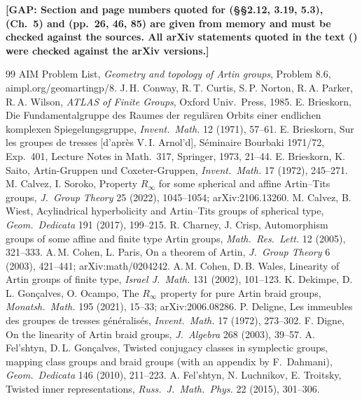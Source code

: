 \documentclass[11pt]{amsart}
\theoremstyle{definition}
\newcommand{\GAP}[1]{\textbf{[GAP: #1]}}
\begin{document}
\noindent\GAP{Section and page numbers quoted for \cite{Hum90} (\S\S2.12, 3.19, 5.3), \cite{OT92} (Ch.~5) and \cite{ATLAS} (pp.~26, 46, 85) are given from memory and must be checked against the sources. All arXiv statements quoted in the text (\cite{CP03,FP06,SV24,Sor26,PS26,JMS25,Tro22,DGO21}) were checked against the arXiv versions.}

\begin{thebibliography}{99}
 AIM Problem List, \emph{Geometry and topology of Artin groups}, Problem 8.6, aimpl.org/geomartingp/8.
 J.\,H. Conway, R.\,T. Curtis, S.\,P. Norton, R.\,A. Parker, R.\,A. Wilson, \emph{ATLAS of Finite Groups}, Oxford Univ.\ Press, 1985.
 E. Brieskorn, Die Fundamentalgruppe des Raumes der regul\"aren Orbits einer endlichen komplexen Spiegelungsgruppe, \emph{Invent.\ Math.} 12 (1971), 57--61.
 E. Brieskorn, Sur les groupes de tresses [d'apr\`es V.\,I. Arnol'd], S\'eminaire Bourbaki 1971/72, Exp.~401, Lecture Notes in Math.\ 317, Springer, 1973, 21--44.
 E. Brieskorn, K. Saito, Artin-Gruppen und Coxeter-Gruppen, \emph{Invent.\ Math.} 17 (1972), 245--271.
 M. Calvez, I. Soroko, Property $R_\infty$ for some spherical and affine Artin--Tits groups, \emph{J.\ Group Theory} 25 (2022), 1045--1054; arXiv:2106.13260.
 M. Calvez, B. Wiest, Acylindrical hyperbolicity and Artin--Tits groups of spherical type, \emph{Geom.\ Dedicata} 191 (2017), 199--215.
 R. Charney, J. Crisp, Automorphism groups of some affine and finite type Artin groups, \emph{Math.\ Res.\ Lett.} 12 (2005), 321--333.
 A.\,M. Cohen, L. Paris, On a theorem of Artin, \emph{J.\ Group Theory} 6 (2003), 421--441; arXiv:math/0204242.
 A.\,M. Cohen, D.\,B. Wales, Linearity of Artin groups of finite type, \emph{Israel J.\ Math.} 131 (2002), 101--123.
 K. Dekimpe, D.\,L. Gon\c{c}alves, O. Ocampo, The $R_\infty$ property for pure Artin braid groups, \emph{Monatsh.\ Math.} 195 (2021), 15--33; arXiv:2006.08286.
 P. Deligne, Les immeubles des groupes de tresses g\'en\'eralis\'es, \emph{Invent.\ Math.} 17 (1972), 273--302.
 F. Digne, On the linearity of Artin braid groups, \emph{J.\ Algebra} 268 (2003), 39--57.
 A. Fel'shtyn, D.\,L. Gon\c{c}alves, Twisted conjugacy classes in symplectic groups, mapping class groups and braid groups (with an appendix by F.~Dahmani), \emph{Geom.\ Dedicata} 146 (2010), 211--223.
 A. Fel'shtyn, N. Luchnikov, E. Troitsky, Twisted inner representations, \emph{Russ.\ J.\ Math.\ Phys.} 22 (2015), 301--306.

\end{thebibliography}
\end{document}
